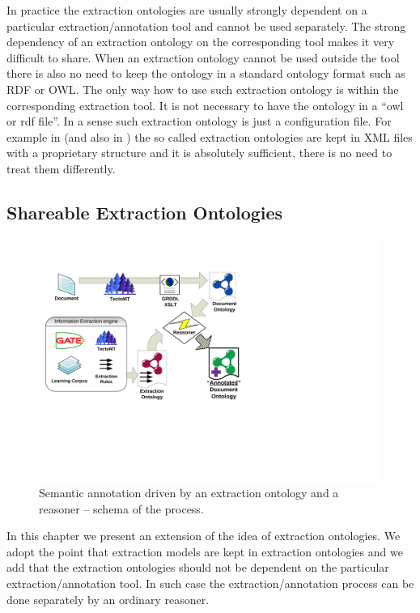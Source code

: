 In practice the extraction ontologies are usually strongly dependent on a particular extraction/annotation tool and cannot be used separately. The strong dependency of an extraction ontology on the corresponding tool makes it very difficult to share. When an extraction ontology cannot be used outside the tool there is also no need to keep the ontology in a standard ontology format such as RDF or OWL. The only way how to use such extraction ontology is within the corresponding extraction tool. It is not necessary to have the ontology in a ``owl or rdf file''. In a sense such extraction ontology is just a configuration file. For example in \citep{springerlink:10.1007/978-3-642-01891-6_5} %
 (and also in \citep{DBLP:conf/er/EmbleyTL02}) the so called extraction ontologies are kept in XML files with a proprietary structure and it is absolutely sufficient, there is no need to treat them differently.



\subsection{Shareable Extraction Ontologies} \label{sec:ch70_extraction_ontologies}



\begin{figure}
\centerline{\includegraphics[angle=-90, width=0.7\hsize]{semantic_rules_app_schema}}
\caption{Semantic annotation driven by an extraction ontology and a reasoner -- schema of the process.}
\label{img:rules_app_schema}
\end{figure}


In this chapter we present an extension of the idea of extraction ontologies. We adopt the point that extraction models are kept in extraction ontologies and we add that the extraction ontologies should not be dependent on the particular extraction/annotation tool. In such case the extraction/annotation process can be done separately by an ordinary reasoner.


